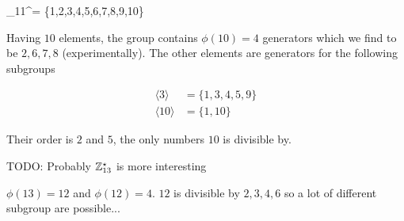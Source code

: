 \bee
\mZ_{11}^\star= \{1,2,3,4,5,6,7,8,9,10\}
\eee

Having $10$ elements, the group contains $\phi(10) = 4$ generators which we find to be $2,6,7,8$ (experimentally). The other elements are generators for the following subgroups

\begin{align*}
\langle 3 \rangle & = \{1,3,4,5,9\}  \\
\langle 10 \rangle & = \{1,10\}
\end{align*}

Their order is $2$ and $5$, the only numbers $10$ is divisible by.


TODO: Probably $\mathbb{Z}_{13}^\star$ is more interesting

$\phi(13) = 12$ and $\phi(12) = 4$. $12$ is divisible by $2,3,4,6$ so a lot of different subgroup are possible...
